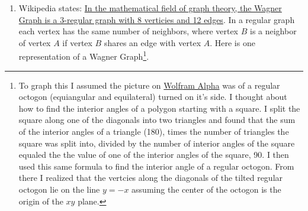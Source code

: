 \documentclass{article}
\begin{document}
\begin{enumerate}
    \item Wikipedia states: \href{https://en.wikipedia.org/wiki/Wagner_graph}{In the mathematical field of graph theory, the Wagner Graph is a 3-regular graph with 8 verticies and 12 edges}. In a regular graph each vertex has the same number of neighbors, where vertex $B$ is a neighbor of vertex $A$ if vertex $B$ shares an edge with vertex $A$. Here is one representation of a Wagner Graph\footnote{To graph this I assumed the picture on \href{http://mathworld.wolfram.com/WagnerGraph.html}{Wolfram Alpha} was of a regular octogon (equiangular and equilateral) turned on it's side. I thought about how to find the interior angles of a polygon starting with a square. I split the square along one of the diagonals into two triangles and found that the sum of the interior angles of a triangle (180\degree), times the number of triangles the square was split into, divided by the number of interior angles of the square equaled the the value of one of the interior angles of the square, 90\degree. I then used this same formula to find the interior angle of a regular octogon. From there I realized that the vertcies along the diagonals of the tilted regular octogon lie on the line $y = -x$ assuming the center of the octogon is the origin of the $xy$ plane. }.
    \begin{center}
    \end{center}

\end{enumerate}
\end{document}
